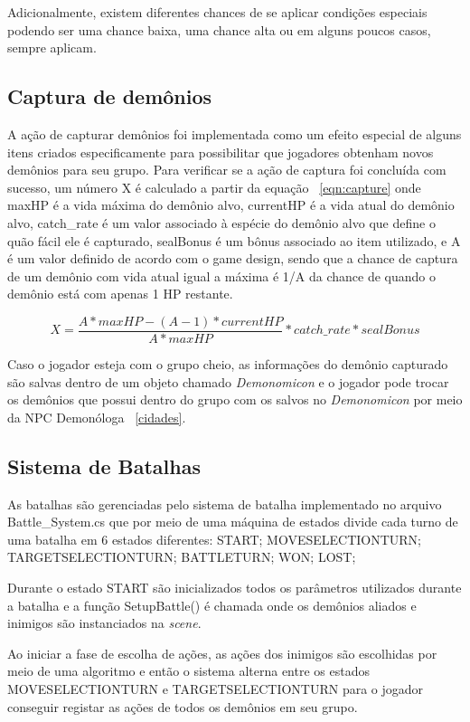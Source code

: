 	Adicionalmente, existem diferentes chances de se aplicar condições especiais podendo ser uma chance baixa, uma chance alta ou em alguns poucos casos, sempre aplicam.

\subsection{Captura de demônios}
	
	A ação de capturar demônios foi implementada como um efeito especial de alguns itens criados especificamente para possibilitar que jogadores obtenham novos demônios para seu grupo. Para verificar se a ação de captura foi concluída com sucesso, um número X é calculado a partir da equação ~\ref{eqn:capture} onde maxHP é a vida máxima do demônio alvo, currentHP é a vida atual do demônio alvo, catch\_rate é um valor associado à espécie do demônio alvo que define o quão fácil ele é capturado, sealBonus é um bônus associado ao item utilizado, e A é um valor definido de acordo com o game design, sendo que a chance de captura de um demônio com vida atual igual a máxima é 1/A da chance de quando o demônio está com apenas 1 HP restante.

\begin{equation}
\label{eqn:capture}
X = \frac{A * maxHP - (A-1)*currentHP}{A*maxHP}*catch\_rate*sealBonus
\end{equation}

	Caso o jogador esteja com o grupo cheio, as informações do demônio capturado são salvas dentro de um objeto chamado \emph{Demonomicon} e o jogador pode trocar os demônios que possui dentro do grupo com os salvos no \emph{Demonomicon} por meio da NPC Demonóloga ~\ref{cidades}.
	
\subsection{Sistema de Batalhas}

	As batalhas são gerenciadas pelo sistema de batalha implementado no arquivo Battle\_System.cs que por meio de uma máquina de estados divide cada turno de uma batalha em 6 estados diferentes: START; MOVESELECTIONTURN; TARGETSELECTIONTURN; BATTLETURN; WON; LOST;
	
	Durante o estado START são inicializados todos os parâmetros utilizados durante a batalha e a função SetupBattle() é chamada onde os demônios aliados e inimigos são instanciados na \emph{scene}.

	Ao iniciar a fase de escolha de ações, as ações dos inimigos são escolhidas por meio de uma algoritmo e então o sistema alterna entre os estados MOVESELECTIONTURN e TARGETSELECTIONTURN para o jogador conseguir registar as ações de todos os demônios em seu grupo.

